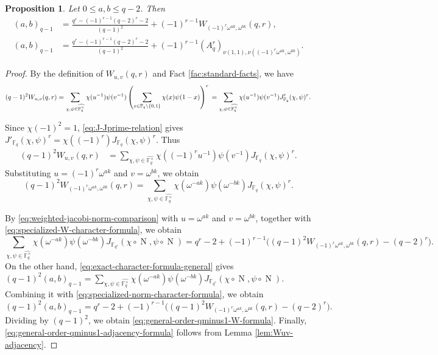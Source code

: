 \documentclass[10pt,a4paper]{article}
\newtheorem{prop}[thm]{Proposition}
\newcommand{\Norm}{\operatorname{N}}
\numberwithin{equation}{section}
\begin{document}
\begin{prop}\label{prop:general-order-qminus1-graph}
Let $0\le a,b\le q-2$. Then
\begin{subequations}
\begin{align}
(a,b)_{q-1}
&=
\frac{q^r-(-1)^{r-1}(q-2)^r-2}{(q-1)^2}
+(-1)^{r-1}W_{(-1)^r\omega^{ak},\omega^{bk}}(q,r),
\label{eq:general-order-qminus1-W-formula}\\
(a,b)_{q-1}
&=
\frac{q^r-(-1)^{r-1}(q-2)^r-2}{(q-1)^2}
+(-1)^{r-1}(A_q^r)_{\nu(1,1),\nu((-1)^r\omega^{ak},\omega^{bk})}.
\label{eq:general-order-qminus1-adjacency-formula}
\end{align}
\end{subequations}
\end{prop}

\begin{proof}
By the definition of $W_{u,v}(q,r)$ and Fact \ref{fac:standard-facts}, we have
\[
(q-1)^2W_{u,v}(q,r)
=
\sum_{\chi,\psi\in \widehat{\mathbb{F}_q^\times}}
\chi(u^{-1})\psi(v^{-1})
\left(\sum_{x\in\mathbb{F}_q\setminus\{0,1\}}\chi(x)\psi(1-x)\right)^r\\
=
\sum_{\chi,\psi\in \widehat{\mathbb{F}_q^\times}}
\chi(u^{-1})\psi(v^{-1})J'_{\mathbb{F}_q}(\chi,\psi)^r.\]

Since $\chi(-1)^2=1$, \eqref{eq:J-Jprime-relation} gives
$J'_{\mathbb{F}_q}(\chi,\psi)^r=\chi((-1)^r)J_{\mathbb{F}_q}(\chi,\psi)^r$.
Thus
\begin{align*}
(q-1)^2W_{u,v}(q,r)
&=
\sum_{\chi,\psi\in \widehat{\mathbb{F}_q^\times}}
\chi((-1)^r u^{-1})\psi(v^{-1})J_{\mathbb{F}_q}(\chi,\psi)^r.
\end{align*}
Substituting $u=(-1)^r\omega^{ak}$ and $v=\omega^{bk}$, we obtain
\begin{equation}\label{eq:specialized-W-character-formula}
(q-1)^2W_{(-1)^r\omega^{ak},\omega^{bk}}(q,r)
=
\sum_{\chi,\psi\in \widehat{\mathbb{F}_q^\times}}
\chi(\omega^{-ak})\psi(\omega^{-bk})J_{\mathbb{F}_q}(\chi,\psi)^r.
\end{equation}

By \eqref{eq:weighted-jacobi-norm-comparison} with $u=\omega^{ak}$ and $v=\omega^{bk}$, together with \eqref{eq:specialized-W-character-formula}, we obtain
\begin{equation}\label{eq:specialized-norm-character-formula}
\sum_{\chi,\psi\in \widehat{\mathbb{F}_q^\times}}
\chi(\omega^{-ak})\psi(\omega^{-bk})
J_{\mathbb{F}_{q^r}}(\chi\circ\Norm,\psi\circ\Norm)
=
q^r-2+(-1)^{r-1}\bigl((q-1)^2W_{(-1)^r\omega^{ak},\omega^{bk}}(q,r)-(q-2)^r\bigr).
\end{equation}
On the other hand, \eqref{eq:exact-character-formula-general} gives
$(q-1)^2(a,b)_{q-1}=\sum_{\chi,\psi\in \widehat{\mathbb{F}_q^\times}}\chi(\omega^{-ak})\psi(\omega^{-bk})J_{\mathbb{F}_{q^r}}(\chi\circ\Norm,\psi\circ\Norm)$.
Combining it with \eqref{eq:specialized-norm-character-formula}, we obtain
\[
(q-1)^2(a,b)_{q-1}
=
q^r-2+(-1)^{r-1}\bigl((q-1)^2W_{(-1)^r\omega^{ak},\omega^{bk}}(q,r)-(q-2)^r\bigr).
\]
Dividing by $(q-1)^2$, we obtain \eqref{eq:general-order-qminus1-W-formula}. Finally, \eqref{eq:general-order-qminus1-adjacency-formula} follows from Lemma \ref{lem:Wuv-adjacency}.
\end{proof}
\end{document}
